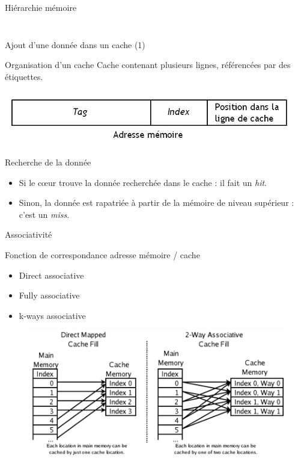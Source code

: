 \begin{frame}{Hiérarchie mémoire}
\begin{columns}[c]
\begin{column}{.4\textwidth}
\begin{figure}[h!]
      \end{figure}
    \end{column}
  \end{columns}
\end{frame}

\begin{frame}{Ajout d'une donnée dans un cache (1)}  
  \begin{block}{Organisation d'un cache}
    Cache contenant plusieurs lignes, référencées par des étiquettes.
  \end{block}
  \begin{center}
  \includegraphics[scale=.35]{images/etiquette.jpeg}
  \end{center}

  \begin{block}{Recherche de la donnée}
    \begin{itemize}
    \item{Si le c\oe ur trouve la donnée recherchée dans le cache : il fait un \emph{hit}.}
    \item{Sinon, la donnée est rapatriée à partir de la mémoire de niveau supérieur : c'est un \emph{miss}.}
    \end{itemize}
  \end{block}
\end{frame}	

\begin{frame}{Associativité}
  \begin{block}{Fonction de correspondance adresse mémoire / cache}
    \begin{itemize}
    \item{Direct associative}
    \item{Fully associative}
    \item{k-ways associative}
    \end{itemize}
  \end{block}
  \begin{figure}[h!]
    \includegraphics[scale=.33]{images/associative.png}
  \end{figure}
\end{frame}

